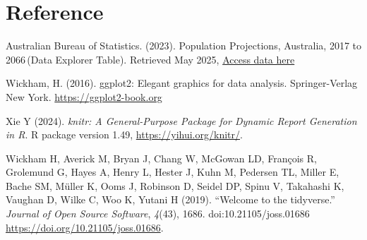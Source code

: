 \documentclass[
  11pt,
]{article}
\begin{document}
\section{Reference}\label{reference}

Australian Bureau of Statistics. (2023). Population Projections,
Australia, 2017 to 2066\,(Data Explorer Table). Retrieved May 2025,
\href{https://dataexplorer.abs.gov.au/vis?tm=Population\%20Projections&pg=0&hc\%5BPeople\%5D=Population\%20\%3E\%20Population\%20Projections&df\%5Bds\%5D=PEOPLE_TOPICS&df\%5Bid\%5D=POP_PROJ_REGION_2012_2061&df\%5Bag\%5D=ABS&df\%5Bvs\%5D=1.0.0&pd=2017\%2C&dq=1\%2B2\%2B3\%2B4\%2B5\%2B6\%2B7\%2B8.1\%2B2.TT.1\%2B2\%2B3.1.1\%2B2\%2B3\%2B4.1\%2B2\%2B3.A&ly\%5Bcl\%5D=SEX_ABS&ly\%5Brs\%5D=FERTILITY\%2CNOM\%2CNIM&ly\%5Brw\%5D=TIME_PERIOD\%2CREGION&to\%5BTIME_PERIOD\%5D=false&vw=ov}{Access
data here}

Wickham, H. (2016). ggplot2: Elegant graphics for data analysis.
Springer-Verlag New York. \url{https://ggplot2-book.org}

Xie Y (2024). \emph{knitr: A General-Purpose Package for Dynamic Report
Generation in R}. R package version 1.49,
\url{https://yihui.org/knitr/}.

Wickham H, Averick M, Bryan J, Chang W, McGowan LD, François R,
Grolemund G, Hayes A, Henry L, Hester J, Kuhn M, Pedersen TL, Miller E,
Bache SM, Müller K, Ooms J, Robinson D, Seidel DP, Spinu V, Takahashi K,
Vaughan D, Wilke C, Woo K, Yutani H (2019). ``Welcome to the
tidyverse.'' \emph{Journal of Open Source Software}, \emph{4}(43), 1686.
doi:10.21105/joss.01686 \url{https://doi.org/10.21105/joss.01686}.
\end{document}

